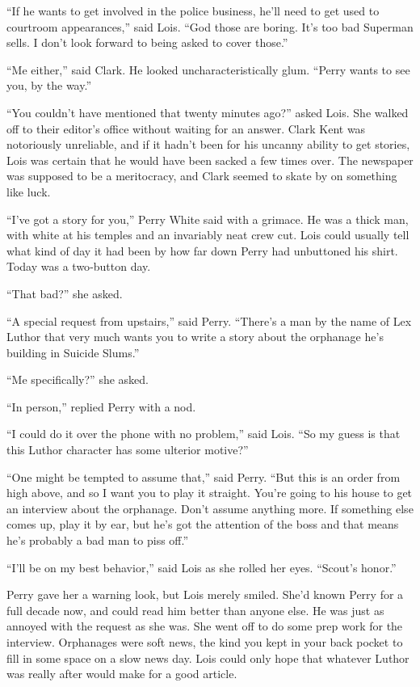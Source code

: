 ``If he wants to get involved in the police business, he'll need to get
used to courtroom appearances,'' said Lois. ``God those are boring. It's
too bad Superman sells. I don't look forward to being asked to cover
those.''

``Me either,'' said Clark. He looked uncharacteristically glum. ``Perry
wants to see you, by the way.''

``You couldn't have mentioned that twenty minutes ago?'' asked Lois. She
walked off to their editor's office without waiting for an answer. Clark
Kent was notoriously unreliable, and if it hadn't been for his uncanny
ability to get stories, Lois was certain that he would have been sacked
a few times over. The newspaper was supposed to be a meritocracy, and
Clark seemed to skate by on something like luck.

``I've got a story for you,'' Perry White said with a grimace. He was a
thick man, with white at his temples and an invariably neat crew cut.
Lois could usually tell what kind of day it had been by how far down
Perry had unbuttoned his shirt. Today was a two‐button day.

``That bad?'' she asked.

``A special request from upstairs,'' said Perry. ``There's a man by the
name of Lex Luthor that very much wants you to write a story about the
orphanage he's building in Suicide Slums.''

``Me specifically?'' she asked.

``In person,'' replied Perry with a nod.

``I could do it over the phone with no problem,'' said Lois. ``So my
guess is that this Luthor character has some ulterior motive?''

``One might be tempted to assume that,'' said Perry. ``But this is an
order from high above, and so I want you to play it straight. You're
going to his house to get an interview about the orphanage. Don't assume
anything more. If something else comes up, play it by ear, but he's got
the attention of the boss and that means he's probably a bad man to piss
off.''

``I'll be on my best behavior,'' said Lois as she rolled her eyes.
``Scout's honor.''

Perry gave her a warning look, but Lois merely smiled. She'd known Perry
for a full decade now, and could read him better than anyone else. He
was just as annoyed with the request as she was. She went off to do some
prep work for the interview. Orphanages were soft news, the kind you
kept in your back pocket to fill in some space on a slow news day. Lois
could only hope that whatever Luthor was really after would make for a
good article.

